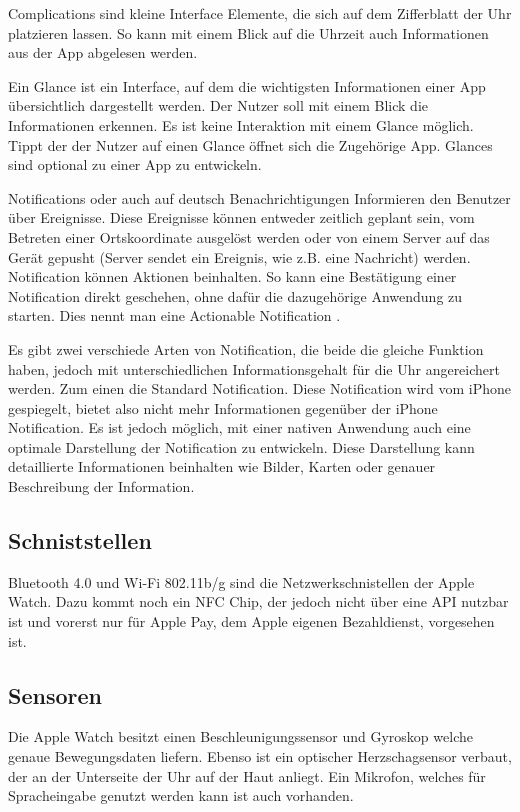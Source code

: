 Complications sind kleine Interface Elemente, die sich auf dem Zifferblatt der Uhr platzieren lassen. So kann mit einem Blick auf die Uhrzeit auch Informationen aus der App abgelesen werden.

Ein Glance ist ein Interface, auf dem die wichtigsten Informationen einer App übersichtlich dargestellt werden. Der Nutzer soll mit einem Blick die Informationen erkennen. Es ist keine Interaktion mit einem Glance möglich. Tippt der der Nutzer auf einen Glance öffnet sich die Zugehörige App. Glances sind optional zu einer App zu entwickeln.

Notifications oder auch auf deutsch Benachrichtigungen Informieren den Benutzer über Ereignisse. Diese Ereignisse können entweder zeitlich geplant sein, vom Betreten einer Ortskoordinate ausgelöst werden oder von einem Server auf das Gerät gepusht (Server sendet ein Ereignis, wie z.B. eine Nachricht) werden. Notification können Aktionen beinhalten. So kann eine Bestätigung einer Notification direkt geschehen, ohne dafür die dazugehörige Anwendung zu starten. Dies nennt man eine Actionable Notification \cite{Apple:2015devAw}.

Es gibt zwei verschiede Arten von Notification, die beide die gleiche Funktion haben, jedoch mit unterschiedlichen Informationsgehalt für die Uhr angereichert werden. Zum einen die Standard Notification. Diese Notification wird vom iPhone gespiegelt, bietet also nicht mehr Informationen gegenüber der iPhone Notification. Es ist jedoch möglich, mit einer nativen Anwendung auch eine optimale Darstellung der Notification zu entwickeln. Diese Darstellung kann detaillierte Informationen beinhalten wie Bilder, Karten oder genauer Beschreibung der Information\cite{Apple:2015notif}.

\subsection{Schniststellen}
Bluetooth 4.0 und Wi-Fi 802.11b/g sind die Netzwerkschnistellen der Apple Watch. Dazu kommt noch ein NFC Chip, der jedoch nicht über eine API nutzbar ist und vorerst nur für Apple Pay, dem Apple eigenen Bezahldienst, vorgesehen ist\cite{RITCHIE:2015aa}. 
\subsection{Sensoren}
Die Apple Watch besitzt einen Beschleunigungssensor und Gyroskop welche genaue Bewegungsdaten liefern. Ebenso ist ein optischer Herzschagsensor verbaut, der an der Unterseite der Uhr auf der Haut anliegt. Ein Mikrofon, welches für Spracheingabe genutzt werden kann ist auch vorhanden.


